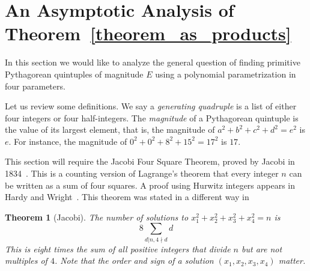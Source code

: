 \documentclass[12pt,table]{article}
\newtheorem{theorem}{Theorem}[section]
\theoremstyle{definition}
\theoremstyle{remark}
\newcommand{\vanish}[1]{}
\numberwithin{equation}{section}
\begin{document}
\vanish{
Moreover, 103 out of 337 quintuples were unable to be 
represented with Hypothesis \ref{as_products}. Still, this is an
 improvement over Hypothesis \ref{as_squares}, which could not
 represent 259 of the quintuples. 
}





\section{An Asymptotic Analysis of Theorem~\ref{theorem_as_products}}



In this section we would like to analyze the general question
of finding primitive Pythagorean quintuples of magnitude $E$ using
a polynomial parametrization in four parameters.



Let us review some definitions. 
We say a  {\em generating quadruple} is a list of
either four integers or four half-integers.
The {\em magnitude} of a Pythagorean 
quintuple is the value of its largest element, that is,
the magnitude of $a^2 + b^2 + c^2 + d^2 = e^2$
is $e$.
For instance, the magnitude of 
$0^2+ 0^2+ 8^2+ 15^2  = 17^2$ is $17$. 


\vanish{
A formula is a function that produces a Pythagorean quintuple when
given a generating quadruple. Recall that the norm of the generating
quadruple equals the magnitude of the Pythagorean quintuple that the
quadruple generates, no matter the formula used. As a result, the
representation found in Theorem \ref{like_Hatcher} does not qualify as
a formula because dividing by the greatest common factor may change
the magnitude.  The intent of this paper was to find a
parameterization for primitive Pythagorean quintuples: to find a list
of formulas whose combined output was every primitive Pythagorean
quintuple.  }



This section will require the Jacobi Four Square Theorem, proved by
Jacobi in 1834~\cite{Jacobi}.  This is a counting
version of Lagrange's theorem that every integer $n$ can
be written as a sum of four squares.
A proof using Hurwitz integers appears in
Hardy and Wright~\cite[Chapter XX, Theorem 386]{Hardy_and_Wright}.
This theorem was
stated in a different way in~\cite{Exciting_Problems}
\begin{theorem}[Jacobi]
\label{theorem_representations}
The number of solutions to $x_1^2 +  x_2^2 +  x_3^2 +  x_4^2  = n$ is 
$$
8\sum_{d|n,4\nmid d}{d}
$$
This is eight times the sum of all positive integers that divide $n$ but are not multiples of $4$. Note that 
the order and sign of a solution $(x_1,x_2,x_3,x_4)$ matter. 
\end{theorem}
\end{document}
